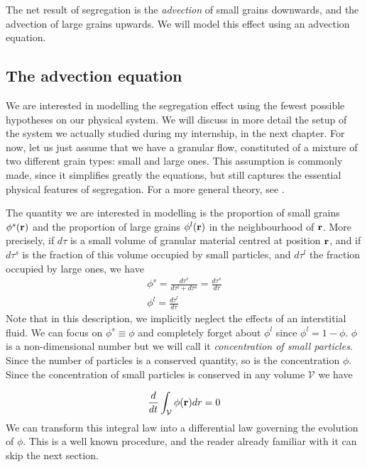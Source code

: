 The net result of segregation is the \textit{advection} of small grains downwards, and the advection of large grains upwards. We will model this effect using an advection equation.

\subsection{The advection equation}

We are interested in modelling the segregation effect using the fewest possible hypotheses on our physical system. We will discuss in more detail the setup of the system we actually studied during my internship, in the next chapter. 
For now, let us just assume that we have a granular flow, constituted of a mixture of two different grain types: small and large ones. This assumption is commonly made, since it simplifies greatly the equations, but still captures the essential physical features of segregation. For a more general theory, see \cite{3phase}.

The quantity we are interested in modelling is the proportion of small grains $\phi^s(\mathbf{r})$ and the proportion of large grains $\phi^l(\mathbf{r})$ in the neighbourhood of $\mathbf{r}$. More precisely, if $d\tau$ is a small volume of granular material centred at position $\mathbf{r}$, and if $d\tau^s$ is the fraction of this volume occupied by small particles, and $d\tau^l$ the fraction occupied by large ones, we have
\begin{align}
	\phi^s = \frac{d\tau^s}{d\tau^l + d\tau^s} = \frac{d\tau^s}{d\tau }\\
	\phi^l = \frac{d\tau^l}{d\tau}
\end{align}
Note that in this description, we implicitly neglect the effects of an interstitial fluid. We can focus on $\phi^s \equiv \phi$ and completely forget about $\phi^l$ since $\phi^l = 1 - \phi$. $\phi$ is a non-dimensional number but we will call it \textit{concentration of small particles}.
Since the number of particles is a conserved quantity, so is the concentration $\phi$. Since the concentration of small particles is conserved in any volume $\mathcal{V}$ we have

\begin{equation}
	\frac{d {}}{d {t}} \int_\mathcal{V} \phi(\mathbf{r}) dr = 0
\end{equation}
We can transform this integral law into a differential law governing the evolution of $\phi$. This is a well known procedure, and the reader already familiar with it can skip the next section.

